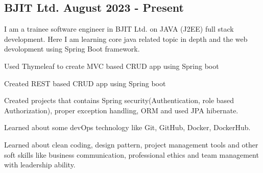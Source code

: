 \documentclass[a4paper,12pt]{article}
\begin{document}


\subsection{{BJIT Ltd. \hfill August 2023 - Present}}
\vspace*{3pt}
I am a trainee software engineer in BJIT Ltd. on JAVA (J2EE) full stack development. Here I am learning core java related topic in depth and the web devolopment using Spring Boot framework. 
\begin{zitemize}
\item Used Thymeleaf to create MVC based CRUD app using Spring boot
\item Created REST based CRUD app using Spring boot
\item Created projects that contains Spring security(Authentication, role based Authorization), proper exception handling, ORM and used JPA hibernate.
\item Learned about some devOps technology like Git, GitHub, Docker, DockerHub.
\item Learned about clean coding, design pattern, project management tools and other soft skills like business communication, professional ethics and team management with leadership ability.
\end{zitemize}
\end{document}
